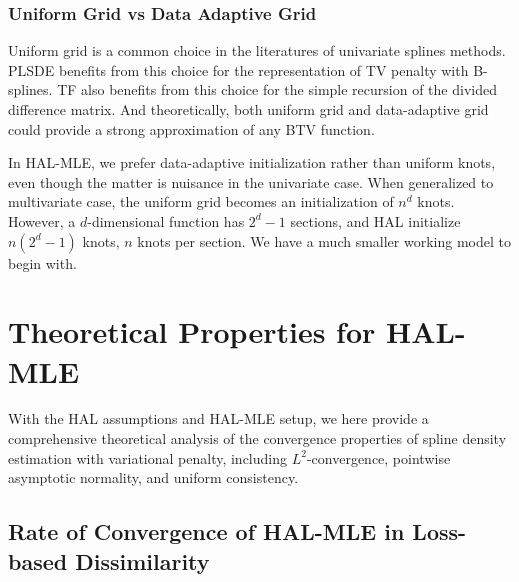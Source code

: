 \subsubsection{Uniform Grid vs Data Adaptive Grid}
Uniform grid is a common choice in the literatures of univariate splines methods. PLSDE \citep{bak2021penalized} benefits from this choice for the representation of TV penalty with B-splines. TF \citep{tibshirani2022divided} also benefits from this choice for the simple recursion of the divided difference matrix. And theoretically, both uniform grid and data-adaptive grid could provide a strong approximation of any BTV function.

In HAL-MLE, we prefer data-adaptive initialization rather than uniform knots, even though the matter is nuisance in the univariate case. When generalized to multivariate case, the uniform grid becomes an initialization of $n^d$ knots. However, a $d$-dimensional function has $2^d - 1$ sections, and HAL initialize $n(2^d - 1)$ knots, $n$ knots per section. We have a much smaller working model to begin with. 

\section{Theoretical Properties for HAL-MLE} \label{Theoretical Properties}
With the HAL assumptions and HAL-MLE setup, we here provide a comprehensive theoretical analysis of the convergence properties of spline density estimation with variational penalty, including $L^2$-convergence, pointwise asymptotic normality, and uniform consistency.


\subsection{Rate of Convergence  of HAL-MLE in Loss-based Dissimilarity} \label{subsec:rate-of-convergence-hal-mle-loss-based-dissimilarity}

